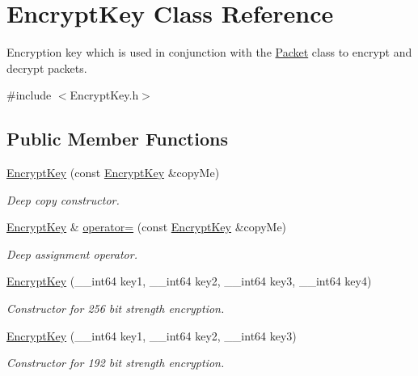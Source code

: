 \hypertarget{class_encrypt_key}{
\section{EncryptKey Class Reference}
\label{class_encrypt_key}
}


Encryption key which is used in conjunction with the \hyperlink{class_packet}{Packet} class to encrypt and decrypt packets.  




{\ttfamily \#include $<$EncryptKey.h$>$}

\subsection*{Public Member Functions}
\begin{DoxyCompactItemize}
\item 
\hyperlink{class_encrypt_key_a859114bdd7164e280a4f5a0d97a003d2}{EncryptKey} (const \hyperlink{class_encrypt_key}{EncryptKey} \&copyMe)
\begin{DoxyCompactList}\small\item\em Deep copy constructor. \item\end{DoxyCompactList}\item 
\hyperlink{class_encrypt_key}{EncryptKey} \& \hyperlink{class_encrypt_key_a2c3aade8edac7f2e0424c8ad2c2cc5fb}{operator=} (const \hyperlink{class_encrypt_key}{EncryptKey} \&copyMe)
\begin{DoxyCompactList}\small\item\em Deep assignment operator. \item\end{DoxyCompactList}\item 
\hyperlink{class_encrypt_key_a082954a979e370dc47e83618c16c248e}{EncryptKey} (\_\-\_\-int64 key1, \_\-\_\-int64 key2, \_\-\_\-int64 key3, \_\-\_\-int64 key4)
\begin{DoxyCompactList}\small\item\em Constructor for 256 bit strength encryption. \item\end{DoxyCompactList}\item 
\hyperlink{class_encrypt_key_a9e1f359a6e1e4893fc8d447115b481be}{EncryptKey} (\_\-\_\-int64 key1, \_\-\_\-int64 key2, \_\-\_\-int64 key3)
\begin{DoxyCompactList}\small\item\em Constructor for 192 bit strength encryption. \item\end{DoxyCompactList}\item 

\end{DoxyCompactItemize}
